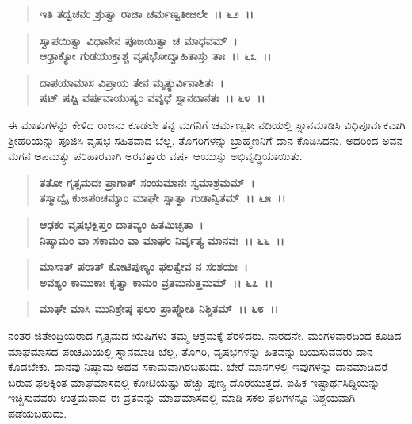 \begin{verse}
\textbf{ಇತಿ ತದ್ವಚನಂ ಶ್ರುತ್ವಾ ರಾಜಾ ಚರ್ಮಣ್ವತೀಜಲೇ~।। ೬೨~।।} 
\end{verse}

\begin{verse}
\textbf{ಸ್ವಾಪಯಿತ್ವಾ ವಿಧಾನೇನ ಪೂಜಯಿತ್ವಾ ಚ ಮಾಧವಮ್~।}\\\textbf{ಆಢ್ರಾಕ್ಯೋ ಗುಡಯುಕ್ತಾಶ್ಚ ವೃಷಭೋದ್ವಾಹಿತಾಸ್ತು ತಾಃ~।। ೬೩~।। }
\end{verse}

\begin{verse}
\textbf{ದಾಪಯಾಮಾಸ ವಿಪ್ರಾಯ ತೇನ ಮೃತ್ಯುರ್ವಿನಾಶಿತಃ~।}\\\textbf{ಷಟ್ ಷಷ್ಟಿ ವರ್ಷವಾಯುಷ್ಯಂ ವವೃಧೆ ಸ್ನಾನದಾನತಃ~।। ೬೪~।।}
\end{verse}

ಈ ಮಾತುಗಳನ್ನು ಕೇಳಿದ ರಾಜನು ಕೂಡಲೇ ತನ್ನ ಮಗನಿಗೆ ಚರ್ಮಣ್ವತೀ ನದಿಯಲ್ಲಿ ಸ್ನಾನಮಾಡಿಸಿ ವಿಧಿಪೂರ್ವಕವಾಗಿ ಶ‍್ರೀಹರಿಯನ್ನು ಪೂಜಿಸಿ ವೃಷಭ ಸಹಿತವಾದ ಬೆಲ್ಲ, ತೊಗರಿಗಳನ್ನು ಬ್ರಾಹ್ಮಣನಿಗೆ ದಾನ ಕೊಡಿಸಿದನು. ಅದರಿಂದ ಅವನ ಮಗನ ಅಪಮತ್ಯು ಪರಿಹಾರವಾಗಿ ಅರವತ್ತಾರು ವರ್ಷ ಆಯುಸ್ಸು ಅಭಿವೃದ್ಧಿಯಾಯಿತು.

\begin{verse}
\textbf{ತತೋ ಗೃತ್ಸಮದಃ ಪ್ರಾಗಾತ್ ಸಂಯಮಾನಃ ಸ್ವಮಾಶ್ರಮಮ್~।}\\\textbf{ತಸ್ಮಾದ್ವೈ ಕುಜಪಂಚಮ್ಯಾಂ ಮಾಘೇ ಸ್ನಾತ್ವಾ ಗುಡಾನ್ವಿತಮ್~।। ೬೫~।। }
\end{verse}

\begin{verse}
\textbf{ಆಢಕಂ ವೃಷಭಕ್ಷಿಪ್ತಂ ದಾತವ್ಯಂ ಹಿತಮಿಚ್ಛತಾ~।}\\\textbf{ನಿಷ್ಕಾಮಂ ವಾ ಸಕಾಮಂ ವಾ ಮಾಘಂ ನಿರ್ವೃತ್ಯ ಮಾನವಃ~।। ೬೬~।।} 
\end{verse}

\begin{verse}
\textbf{ಮಾಸಾತ್ ಪರಾತ್ ಕೋಟಿಪುಣ್ಯಂ ಫಲತ್ವೇವ ನ ಸಂಶಯಃ~।}\\\textbf{ಅವಶ್ಯಂ ಕಾಮುಕಾಃ ಕೃತ್ವಾ ಕಾಮಂ ವ್ರತಮನುತ್ತಮಮ್~।। ೬೭~।।} 
\end{verse}

\begin{verse}
\textbf{ಮಾಘೇ ಮಾಸಿ ಮುನಿಶ್ರೇಷ್ಠ ಫಲಂ ಪ್ರಾಪ್ನೋತಿ ನಿಶ್ಚಿತಮ್~।। ೬೮~।।}
\end{verse}

ನಂತರ ಜಿತೇಂದ್ರಿಯರಾದ ಗೃತ್ಸಮದ ಋಷಿಗಳು ತಮ್ಮ ಆಶ್ರಮಕ್ಕೆ ತೆರಳಿದರು. ನಾರದನೇ, ಮಂಗಳವಾರದಿಂದ ಕೂಡಿದ ಮಾಘಮಾಸದ ಪಂಚಮಿಯಲ್ಲಿ ಸ್ನಾನಮಾಡಿ ಬೆಲ್ಲ, ತೊಗರಿ, ವೃಷಭಗಳನ್ನು ಹಿತವನ್ನು ಬಯಸುವವರು ದಾನ ಕೊಡಬೇಕು. ದಾನವು ನಿಷ್ಕಾಮ ಅಥವ ಸಕಾಮವಾಗಿರಬಹುದು. ಬೇರೆ ಮಾಸಗಳಲ್ಲಿ ಇವುಗಳನ್ನು ದಾನಮಾಡಿದರೆ ಬರುವ ಫಲಕ್ಕಿಂತ ಮಾಘಮಾಸದಲ್ಲಿ ಕೋಟಿಯಷ್ಟು ಹೆಚ್ಚು ಪುಣ್ಯ ದೊರೆಯುತ್ತದೆ. ಐಹಿಕ ಇಷ್ಟಾರ್ಥಸಿದ್ದಿಯನ್ನು ಇಚ್ಚಿಸುವವರು ಉತ್ತಮವಾದ ಈ ವ್ರತವನ್ನು ಮಾಘಮಾಸದಲ್ಲಿ ಮಾಡಿ ಸಕಲ ಫಲಗಳನ್ನೂ ನಿಶ್ಚಯವಾಗಿ ಪಡೆಯಬಹುದು.

